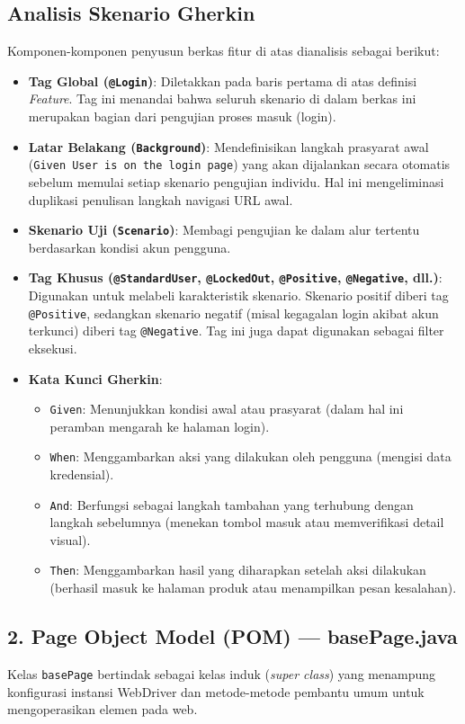 \documentclass[a4paper,oneside,11pt]{book}
\begin{document}
\subsection{Analisis Skenario Gherkin}
Komponen-komponen penyusun berkas fitur di atas dianalisis sebagai berikut:
\begin{itemize}
    \item \textbf{Tag Global (\texttt{@Login})}: Diletakkan pada baris pertama di atas definisi \textit{Feature}. Tag ini menandai bahwa seluruh skenario di dalam berkas ini merupakan bagian dari pengujian proses masuk (login).
    \item \textbf{Latar Belakang (\texttt{Background})}: Mendefinisikan langkah prasyarat awal (\texttt{Given User is on the login page}) yang akan dijalankan secara otomatis sebelum memulai setiap skenario pengujian individu. Hal ini mengeliminasi duplikasi penulisan langkah navigasi URL awal.
    \item \textbf{Skenario Uji (\texttt{Scenario})}: Membagi pengujian ke dalam alur tertentu berdasarkan kondisi akun pengguna.
    \item \textbf{Tag Khusus (\texttt{@StandardUser}, \texttt{@LockedOut}, \texttt{@Positive}, \texttt{@Negative}, dll.)}: Digunakan untuk melabeli karakteristik skenario. Skenario positif diberi tag \texttt{@Positive}, sedangkan skenario negatif (misal kegagalan login akibat akun terkunci) diberi tag \texttt{@Negative}. Tag ini juga dapat digunakan sebagai filter eksekusi.
    \item \textbf{Kata Kunci Gherkin}:
    \begin{itemize}
        \item \texttt{Given}: Menunjukkan kondisi awal atau prasyarat (dalam hal ini peramban mengarah ke halaman login).
        \item \texttt{When}: Menggambarkan aksi yang dilakukan oleh pengguna (mengisi data kredensial).
        \item \texttt{And}: Berfungsi sebagai langkah tambahan yang terhubung dengan langkah sebelumnya (menekan tombol masuk atau memverifikasi detail visual).
        \item \texttt{Then}: Menggambarkan hasil yang diharapkan setelah aksi dilakukan (berhasil masuk ke halaman produk atau menampilkan pesan kesalahan).
    \end{itemize}
\end{itemize}

\subsection{2. Page Object Model (POM) — basePage.java}
Kelas \texttt{basePage} bertindak sebagai kelas induk (\textit{super class}) yang menampung konfigurasi instansi WebDriver dan metode-metode pembantu umum untuk mengoperasikan elemen pada web.
\end{document}
